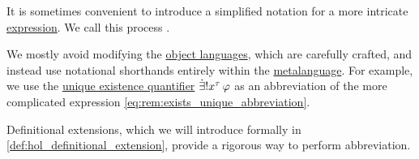 \begin{concept}\label{con:syntactic_abbreviation}\mimprovised
  It is sometimes convenient to introduce a simplified notation for a more intricate \hyperref[con:expression]{expression}. We call this process .

  We mostly avoid modifying the \hyperref[con:metalogic]{object languages}, which are carefully crafted, and instead use notational shorthands entirely within the \hyperref[con:metalogic]{metalanguage}. For example, we use the \hyperref[con:description_operator/exists_unique]{unique existence quantifier} \( \qExists {x^\tau} \varphi \) as an abbreviation of the more complicated expression \eqref{eq:rem:exists_unique_abbreviation}.

  Definitional extensions, which we will introduce formally in \cref{def:hol_definitional_extension}, provide a rigorous way to perform abbreviation.
\end{concept}

